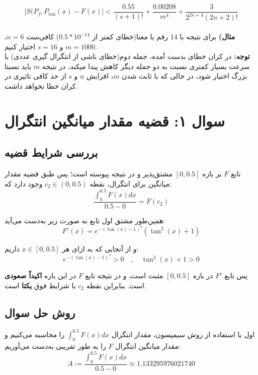 \documentclass[12pt,a4paper]{article}
\begin{document}
\begin{equation}
    |S(P_f,P_{\tan}(x) - F(x)| < \frac{0.55}{(s+1)!} + \frac{0.00208}{m^4} + \frac{3}{2^{2n+4}(2n+2)!}
    \label{F_error}
\end{equation}
\\
\textbf{مثال)}   برای نتیجه با 14 رقم با معنا(خطای کمتر از $0.5  * 10^{-14}$) کافی‌ست $n = 6$، $m = 1000$ و $s = 16$ اختیار کنیم.
\\
\textbf{توجه:} در کران خطای بدست آمده، جمله دوم(خطای ناشی از انتگرال گیری عددی) با سرعت بسیار کمتری نسبت به دو جمله دیگر کاهش پیدا میکند، در نتیجه $m$ باید نسبتا بزرگ اختیار شود، در حالی که با ثابت شدن $m$، افزایش $n$ و $s$ از حد کافی تاثیری در کران خطا نخواهد داشت.

\section{سوال ۱: قضیه مقدار میانگین انتگرال}

\subsection{بررسی شرایط قضیه}
تابع $F$ بر بازه $[0, 0.5]$ مشتق‌پذیر و در نتیجه پیوسته است؛ پس طبق قضیه مقدار میانگین برای انتگرال، نقطه $c_2 \in (0, 0.5)$ وجود دارد که:
\begin{equation*}
\frac{\int_{0}^{0.5} F(x) dx}{0.5 - 0} = F(c_2)
\end{equation*}

همین‌طور مشتق اول تابع به صورت زیر به‌دست می‌آید:
\begin{equation*}
F'(x) = e^{-(\tan(x)-1)^2} (\tan^2(x) + 1)
\end{equation*}

و از آنجایی که به ازای هر $x \in [0, 0.5]$ داریم:
\begin{equation*}
e^{-(\tan(x)-1)^2} > 0 \quad , \quad \tan^2(x) + 1 > 0
\end{equation*}

پس تابع $F'$ در بازه $[0, 0.5]$ مثبت است، و در نتیجه تابع $F$ در این بازه \textbf{اکیداً صعودی} است. بنابراین نقطه $c_2$ با شرایط فوق \textbf{یکتا} است.


\subsection{روش حل سوال}
اول با استفاده از روش سیمپسون، مقدار انتگرال $\int_{0}^{0.5} F(x) dx$ را محاسبه می‌کنیم و مقدار میانگین انتگرال $F$ را به طور تقریبی به‌دست می‌آوریم:
\begin{equation*}
A := \frac{\int_{0}^{0.5} F(x) dx}{0.5 - 0} \approx 1.133295976021740
\end{equation*}
\end{document}
